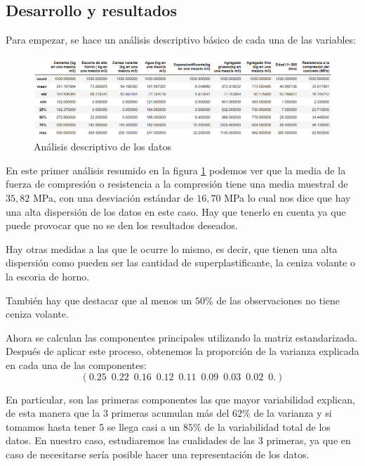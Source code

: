 \subsection*{Desarrollo y resultados}

\noindent Para empezar, se hace un análisis descriptivo básico de cada una de las variables:
\begin{figure}[h]
  \centering
  \includegraphics[scale=0.47]{Documentos Extra/Imagenes/Resumen_Basicos.png}
  \caption{Análisis descriptivo de los datos}
  \label{fig:resumen_basicos}
\end{figure}

\noindent En este primer análisis resumido en la figura \ref{fig:resumen_basicos} podemos ver que la media de la fuerza de compresión o resistencia a la compresión tiene una media muestral de $35,82$ MPa, con una desviación estándar de $16,70$ MPa lo cual nos dice que hay una alta dispersión de los datos en este caso. Hay que tenerlo en cuenta ya que puede provocar que no se den los resultados deseados. 

\noindent Hay otras medidas a las que le ocurre lo mismo, es decir, que tienen una alta dispersión como pueden ser las cantidad de superplastificante, la ceniza volante o la escoria de horno. 

\noindent También hay que destacar que al menos un $50\%$ de las observaciones no tiene ceniza volante.  

\noindent Ahora se calculan las componentes principales utilizando la matriz estandarizada. Después de aplicar este proceso, obtenemos la proporción de la varianza explicada en cada una de las componentes:
\begin{equation*}
(0.25 \enspace 0.22 \enspace 0.16 \enspace 0.12 \enspace 0.11 \enspace 0.09 \enspace 0.03 \enspace 0.02 \enspace 0.  )
\end{equation*}

\noindent En particular, son las primeras componentes las que mayor variabilidad explican, de esta manera que la 3 primeras acumulan más del $62\%$ de la varianza y si tomamos hasta tener 5 se llega casi a un $85\%$ de la variabilidad total de los datos. En nuestro caso, estudiaremos las cualidades de las 3 primeras, ya que en caso de necesitarse sería posible hacer una representación de los datos. 

